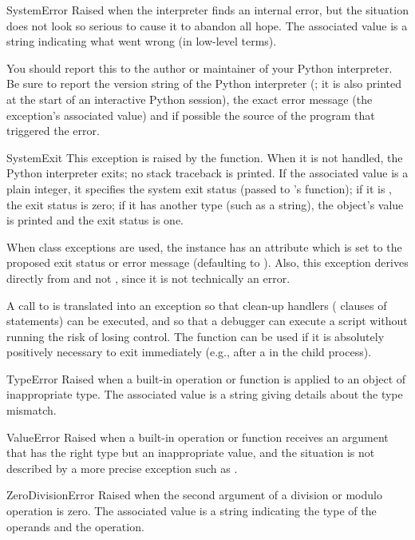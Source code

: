 \begin{excdesc}{SystemError}
  Raised when the interpreter finds an internal error, but the
  situation does not look so serious to cause it to abandon all hope.
  The associated value is a string indicating what went wrong (in
  low-level terms).
  
  You should report this to the author or maintainer of your Python
  interpreter.  Be sure to report the version string of the Python
  interpreter (; it is also printed at the start of an
  interactive Python session), the exact error message (the exception's
  associated value) and if possible the source of the program that
  triggered the error.
\end{excdesc}

\begin{excdesc}{SystemExit}
  This exception is raised by the  function.  When it
  is not handled, the Python interpreter exits; no stack traceback is
  printed.  If the associated value is a plain integer, it specifies the
  system exit status (passed to \C{}'s  function); if it is
  , the exit status is zero; if it has another type (such as
  a string), the object's value is printed and the exit status is one.

When class exceptions are used, the instance has an attribute
 which is set to the proposed exit status or error message
(defaulting to ).  Also, this exception derives directly
from  and not , since it 
is not technically an error.
  
  A call to  is translated into an exception so that
  clean-up handlers ( clauses of  statements)
  can be executed, and so that a debugger can execute a script without
  running the risk of losing control.  The  function
  can be used if it is absolutely positively necessary to exit
  immediately (e.g., after a  in the child process).
\end{excdesc}

\begin{excdesc}{TypeError}
  Raised when a built-in operation or function is applied to an object
  of inappropriate type.  The associated value is a string giving
  details about the type mismatch.
\end{excdesc}

\begin{excdesc}{ValueError}
  Raised when a built-in operation or function receives an argument
  that has the right type but an inappropriate value, and the
  situation is not described by a more precise exception such as
  .
\end{excdesc}

\begin{excdesc}{ZeroDivisionError}
  Raised when the second argument of a division or modulo operation is
  zero.  The associated value is a string indicating the type of the
  operands and the operation.
\end{excdesc}
